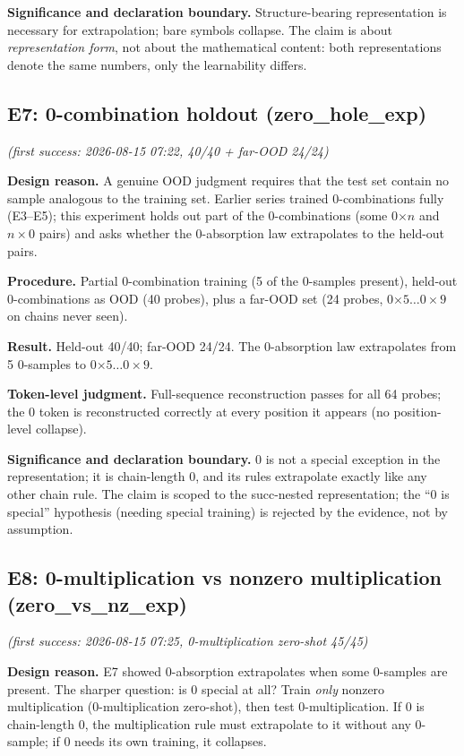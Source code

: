 \documentclass[sigplan,10pt,anonymous,review]{acmart}
\begin{document}
\textbf{Significance and declaration boundary.} Structure-bearing
representation is necessary for extrapolation; bare symbols collapse. The
claim is about \emph{representation form}, not about the mathematical
content: both representations denote the same numbers, only the
learnability differs.

\subsection{E7: 0-combination holdout (zero\_hole\_exp)}\hfill\textit{(first success: 2026-08-15 07:22, 40/40 + far-OOD 24/24)}

\textbf{Design reason.} A genuine OOD judgment requires that the test set
contain no sample analogous to the training set. Earlier series trained
0-combinations fully (E3--E5); this experiment holds out part of the
0-combinations (some 0$\times n$ and $n\times$0 pairs) and asks whether the
0-absorption law extrapolates to the held-out pairs.

\textbf{Procedure.} Partial 0-combination training (5 of the 0-samples
present), held-out 0-combinations as OOD (40 probes), plus a far-OOD set
(24 probes, 0$\times5\ldots0\times9$ on chains never seen).

\textbf{Result.} Held-out 40/40; far-OOD 24/24. The 0-absorption law
extrapolates from 5 0-samples to 0$\times5\ldots0\times9$.

\textbf{Token-level judgment.} Full-sequence reconstruction passes for all
64 probes; the 0 token is reconstructed correctly at every position it
appears (no position-level collapse).

\textbf{Significance and declaration boundary.} 0 is not a special
exception in the representation; it is chain-length 0, and its rules
extrapolate exactly like any other chain rule. The claim is scoped to the
succ-nested representation; the ``0 is special'' hypothesis (needing
special training) is rejected by the evidence, not by assumption.

\subsection{E8: 0-multiplication vs nonzero multiplication (zero\_vs\_nz\_exp)}\hfill\textit{(first success: 2026-08-15 07:25, 0-multiplication zero-shot 45/45)}

\textbf{Design reason.} E7 showed 0-absorption extrapolates when some
0-samples are present. The sharper question: is 0 special at all? Train
\emph{only} nonzero multiplication (0-multiplication zero-shot), then test
0-multiplication. If 0 is chain-length 0, the multiplication rule must
extrapolate to it without any 0-sample; if 0 needs its own training, it
collapses.
\end{document}
